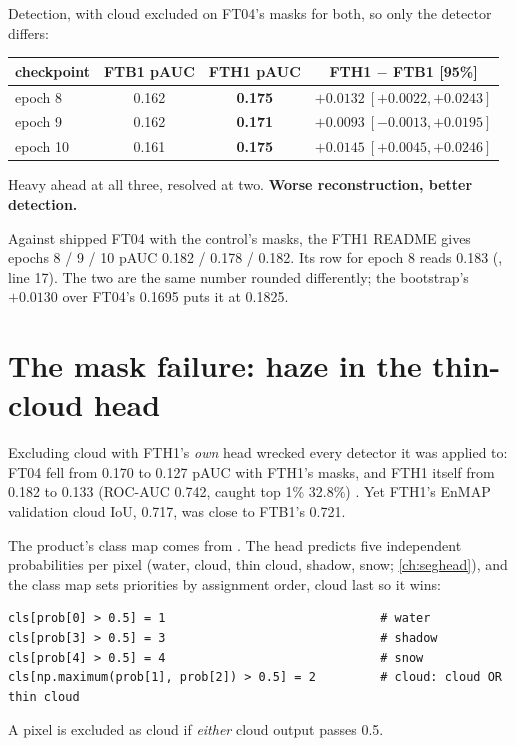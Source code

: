 Detection, with cloud excluded on FT04's masks for both, so only the detector differs:
\begin{center}\small
\begin{tabular}{lccc}
\toprule
checkpoint & FTB1 pAUC & FTH1 pAUC & FTH1 $-$ FTB1 [95\%]\\
\midrule
epoch 8 & 0.162 & \textbf{0.175} & $+0.0132\ [+0.0022,+0.0243]$\\
epoch 9 & 0.162 & \textbf{0.171} & $+0.0093\ [-0.0013,+0.0195]$\\
epoch 10 & 0.161 & \textbf{0.175} & $+0.0145\ [+0.0045,+0.0246]$\\
\bottomrule
\end{tabular}
\end{center}
Heavy ahead at all three, resolved at two. \textbf{Worse reconstruction, better detection.}

\begin{sourcenote}[: 0.182 or 0.183]
Against shipped FT04 with the control's masks, the FTH1 README gives epochs 8 / 9 / 10 pAUC 0.182 / 0.178 / 0.182.
Its  row for epoch 8 reads 0.183 (, line 17). The two
are the same number rounded differently; the bootstrap's $+0.0130$ over FT04's 0.1695 puts it at 0.1825.
\end{sourcenote}

\section{The mask failure: haze in the thin-cloud head}\label{sec:heavy:haze}

Excluding cloud with FTH1's \emph{own} head wrecked every detector it was applied to: FT04 fell from 0.170 to 0.127
pAUC with FTH1's masks, and FTH1 itself from 0.182 to 0.133 (ROC-AUC 0.742, caught top 1\% 32.8\%)
. Yet FTH1's EnMAP validation cloud IoU, 0.717, was close to FTB1's 0.721.

The product's class map comes from . The head predicts five independent probabilities
per pixel (water, cloud, thin cloud, shadow, snow; \cref{ch:seghead}), and the class map sets priorities by
assignment order, cloud last so it wins:
\begin{lstlisting}
cls[prob[0] > 0.5] = 1                              # water
cls[prob[3] > 0.5] = 3                              # shadow
cls[prob[4] > 0.5] = 4                              # snow
cls[np.maximum(prob[1], prob[2]) > 0.5] = 2         # cloud: cloud OR thin cloud
\end{lstlisting}
A pixel is excluded as cloud if \emph{either} cloud output passes 0.5.

